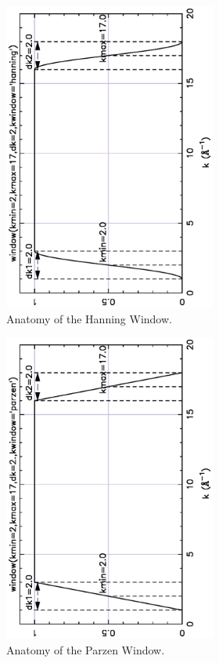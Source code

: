 \begin{figure}[tb] \begin{center}
  \includegraphics[width=2.75in,angle=-90]{figs/win_hanning.ps}
  \caption{ Anatomy of the Hanning Window.}\label{Fig:WinHanning}
\end{center} \end{figure}

\begin{figure}[tb] \begin{center}
  \includegraphics[width=2.75in,angle=-90]{figs/win_parzen.ps}
  \caption{ Anatomy of the Parzen Window.}\label{Fig:WinParzen}
\end{center} \end{figure}

